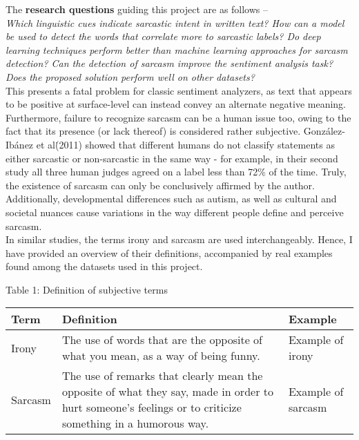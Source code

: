 \documentclass[12pt,a4paper]{article}
\begin{document}
\noindent The \textbf{research questions} guiding this project are as follows --
\\ \indent \textit{Which linguistic cues indicate sarcastic intent in written text? How can a model be used to detect the words that correlate more to sarcastic labels? Do deep learning techniques perform better than machine learning approaches for sarcasm detection? Can the detection of sarcasm improve the sentiment analysis task? Does the proposed solution perform well on other datasets?}\\

This presents a fatal problem for classic sentiment analyzers, as text that appears to be positive at surface-level can instead convey an alternate negative meaning. Furthermore, failure to recognize sarcasm can be a human issue too, owing to the fact that its presence (or lack thereof) is considered rather subjective. Gonz{\'a}lez-Ib{\'a}nez et al\. (2011) \cite{gonzalez2011identifying} showed that different humans do not classify statements as either sarcastic or non-sarcastic in the same way - for example, in their second study all three human judges agreed on a label less than 72\% of the time. Truly, the existence of sarcasm can only be conclusively affirmed by the author. Additionally, developmental differences such as autism, as well as cultural and societal nuances cause variations in the way different people define and perceive sarcasm. \\


In similar studies, the terms irony and sarcasm are used interchangeably. Hence, I have provided an overview of their definitions, accompanied by real examples found among the datasets used in this project.

\begin{center}
	Table 1: Definition of subjective terms
\end{center}
\begin{tabular}{p{3cm}p{8cm}p{5cm}}
	\hline
	\textbf{Term} & \textbf{Definition} & \textbf{Example}\\
	\hline\hline
	Irony & The use of words that are the opposite of what you mean, as a way of being funny. \cite{cambridgeirony2019} &  Example of irony\\
	\hline
	Sarcasm & The use of remarks that clearly mean the opposite of what they say, made in order to hurt someone's feelings or to criticize something in a humorous way. \cite{cambridgesarcasm2019} &  Example of sarcasm\\
	\hline
\end{tabular}\\
\end{document}
